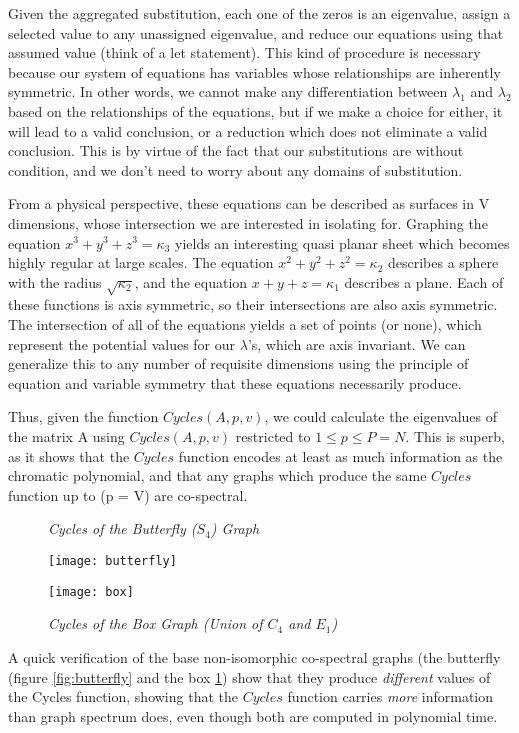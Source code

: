 Given the aggregated substitution, each one of the zeros is an eigenvalue, assign a selected value to any unassigned eigenvalue, and reduce our equations using that assumed value (think of a let statement).
This kind of procedure is necessary because our system of equations has variables whose relationships are inherently symmetric.
In other words, we cannot make any differentiation between $\lambda_1$ and $\lambda_2$ based on the relationships of the equations, but if we make a choice for either, it will lead to a valid conclusion, or a reduction which does not eliminate a valid conclusion.
This is by virtue of the fact that our substitutions are without condition, and we don't need to worry about any domains of substitution.

From a physical perspective, these equations can be described as surfaces in V dimensions, whose intersection we are interested in isolating for. 
Graphing the equation $x^3 + y^3 + z^3 = \kappa_3$ yields an interesting quasi planar sheet which becomes highly regular at large scales.  
The equation $x^2 + y^2 + z^2 = \kappa_2$ describes a sphere with the radius $\sqrt{\kappa_2}$, and the equation $x + y + z = \kappa_1$ describes a plane. 
Each of these functions is axis symmetric, so their intersections are also axis symmetric.  
The intersection of all of the equations yields a set of points (or none), which represent the potential values for our $\lambda$'s, which are axis invariant. 
We can generalize this to any number of requisite dimensions using the principle of equation and variable symmetry that these equations necessarily produce.

Thus, given the function $Cycles(A, p, v)$, we could calculate the eigenvalues of the matrix A using $Cycles(A, p, v)$ restricted to $1 \leq p \leq P = N$. 
This is superb, as it shows that the $Cycles$ function encodes at least as much information as the chromatic polynomial, and that any graphs which produce the same $Cycles$ function up to (p = V) are co-spectral. 

\begin{figure}[h]
\caption{\emph{Cycles of the Butterfly ($S_4$) Graph}}
\centering
\texttt{[image: butterfly]}
\label{fig:butterfly}
\caption{\emph{Cycles of the Box Graph (Union of $C_4$ and $E_1$)}}
\centering
\texttt{[image: box]}
\label{fig:box}
\end{figure}

A quick verification of the base non-isomorphic co-spectral graphs (the butterfly (figure \ref{fig:butterfly} and the box \ref{fig:box}) show that they produce \emph{different} values of the Cycles function, showing that the $Cycles$ function carries \emph{more} information than graph spectrum does, even though both are computed in polynomial time. 

